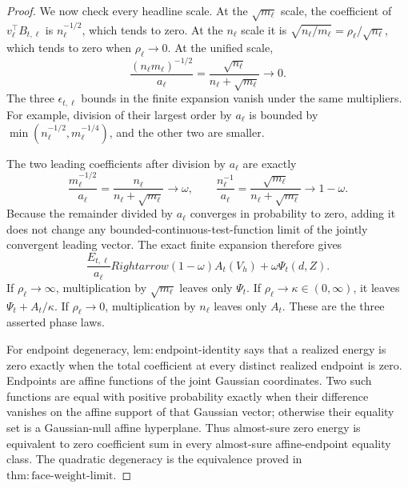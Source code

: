 \documentclass{article}
\begin{document}
\begin{proof}
We now check every headline scale.  At the \(\sqrt{m_\ell}\) scale, the coefficient of \(v_\ell^\top B_{t,\ell}\) is \(n_\ell^{-1/2}\), which tends to zero.  At the \(n_\ell\) scale it is
\(\sqrt{n_\ell/m_\ell}=\rho_\ell/\sqrt{n_\ell}\), which tends to zero when \(\rho_\ell\to0\).  At the unified scale,
\[
 \frac{(n_\ell m_\ell)^{-1/2}}{a_\ell}
 =\frac{\sqrt{n_\ell}}{n_\ell+\sqrt{m_\ell}}\longrightarrow0.
\]
The three \(\epsilon_{t,\ell}\) bounds in the finite expansion vanish under the same multipliers.  For example, division of their largest order by \(a_\ell\) is bounded by
\(\min(n_\ell^{-1/2},m_\ell^{-1/4})\), and the other two are smaller.

The two leading coefficients after division by \(a_\ell\) are exactly
\[
 \frac{m_\ell^{-1/2}}{a_\ell}
 =\frac{n_\ell}{n_\ell+\sqrt{m_\ell}}\longrightarrow\omega,
 \qquad
 \frac{n_\ell^{-1}}{a_\ell}
 =\frac{\sqrt{m_\ell}}{n_\ell+\sqrt{m_\ell}}\longrightarrow1-\omega.
\]
Because the remainder divided by \(a_\ell\) converges in probability to zero, adding it does not change any bounded-continuous-test-function limit of the jointly convergent leading vector.  The exact finite expansion therefore gives
\[
 \frac{E_{t,\ell}}{a_\ell}Rightarrow
 (1-\omega)A_t(V_h)+\omega\Psi_t(d,Z).
\]
If \(\rho_\ell\to\infty\), multiplication by \(\sqrt{m_\ell}\) leaves only \(\Psi_t\).  If \(\rho_\ell\to\kappa\in(0,\infty)\), it leaves
\(\Psi_t+A_t/\kappa\).  If \(\rho_\ell\to0\), multiplication by \(n_\ell\) leaves only \(A_t\).  These are the three asserted phase laws.

For endpoint degeneracy, \(\mathrm{lem:endpoint\mbox{-}identity}\) says that a realized energy is zero exactly when the total coefficient at every distinct realized endpoint is zero.  Endpoints are affine functions of the joint Gaussian coordinates.  Two such functions are equal with positive probability exactly when their difference vanishes on the affine support of that Gaussian vector; otherwise their equality set is a Gaussian-null affine hyperplane.  Thus almost-sure zero energy is equivalent to zero coefficient sum in every almost-sure affine-endpoint equality class.  The quadratic degeneracy is the equivalence proved in \(\mathrm{thm:face\mbox{-}weight\mbox{-}limit}\).
\end{proof}
\end{document}
